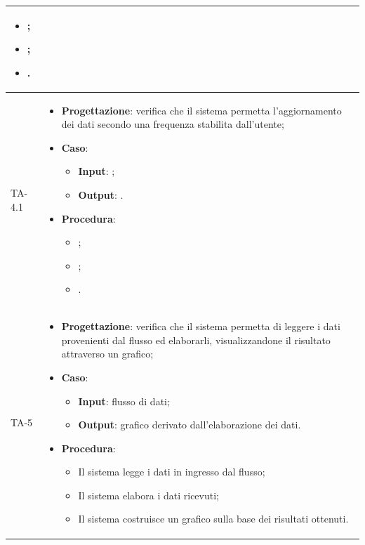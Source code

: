 \begin{longtable}{|C{2.5cm}|C{13cm}|}
\begin{itemize}
\begin{itemize}
		\item ;
		\item ;
		\item .
	\end{itemize} 
\end{itemize}\\
\hline
{TA-4.1} &
\begin{itemize}
	\item \textbf{Progettazione}: verifica che il sistema permetta l'aggiornamento dei dati secondo una frequenza stabilita dall'utente;
	\item \textbf{Caso}: 
	\begin{itemize}
		\item \textbf{Input}: ;
		\item \textbf{Output}: .
	\end{itemize}
	\item \textbf{Procedura}:
	\begin{itemize}
		\item ;
		\item ;
		\item .
	\end{itemize} 
\end{itemize} \\
\hline
{TA-5} &
\begin{itemize}
	\item \textbf{Progettazione}: verifica che il sistema permetta di leggere i dati provenienti dal flusso ed elaborarli, visualizzandone il risultato attraverso un grafico;
	\item \textbf{Caso}: 
	\begin{itemize}
		\item \textbf{Input}: flusso di dati;
		\item \textbf{Output}: grafico derivato dall'elaborazione dei dati.
	\end{itemize}
	\item \textbf{Procedura}:
	\begin{itemize}
		\item Il sistema legge i dati in ingresso dal flusso;
		\item Il sistema elabora i dati ricevuti;
		\item Il sistema costruisce un grafico sulla base dei risultati ottenuti.
	\end{itemize} 
\end{itemize} \\
\hline


\end{longtable}
